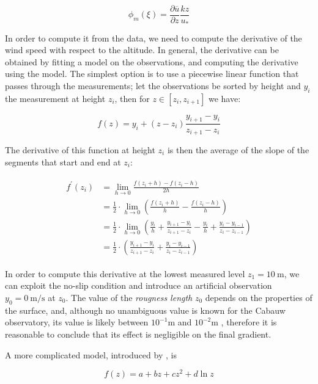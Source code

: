 \documentclass[a4paper]{book}
\begin{document}
$$
\phi_m(\xi)=\frac{\partial\overline{u}}{\partial z}\frac{kz}{u_*}
$$

In order to compute it from the data, we need to compute the derivative of the wind speed with respect to the altitude. In general, the derivative can be obtained by fitting a model on the observations, and computing the derivative using the model. The simplest option is to use a piecewise linear function that passes through the measurements; let the observations be sorted by height and $y_i$ the measurement at height $z_i$, then for $z\in[z_i,z_{i+1}]$ we have:

\begin{equation}
f(z)=y_i+(z-z_i)\frac{y_{i+1}-y_i}{z_{i+1}-z_i}
\end{equation}

The derivative of this function at height $z_i$ is then the average of the slope of the segments that start and end at $z_i$:

\begin{align}
\label{eq:fd_gradient}
\begin{split}
f^\prime(z_i)&=\lim_{h\rightarrow 0}\frac{f(z_i+h)-f(z_i-h)}{2h} \\
&=\frac{1}{2}\cdot\lim_{h\rightarrow 0}\left(\frac{f(z_i+h)}{h}-\frac{f(z_i-h)}{h}\right) \\
&=\frac{1}{2}\cdot\lim_{h\rightarrow 0}\left(
\frac{y_i}{h}+\frac{y_{i+1}-y_i}{z_{i+1}-z_i}-\frac{y_i}{h}+\frac{y_i-y_{i-1}}{z_i-z_{i-1}}
\right)\\
&=\frac{1}{2}\cdot\left(
\frac{y_{i+1}-y_i}{z_{i+1}-z_i}+\frac{y_i-y_{i-1}}{z_i-z_{i-1}}
\right)
\end{split}
\end{align}

In order to compute this derivative at the lowest measured level $z_1=\SI{10}{\meter}$, we can exploit the no-slip condition and introduce an artificial observation $y_0=\SI{0}{\meter\per\second}$ at $z_0$. The value of the \emph{rougness length} $z_0$ depends on the properties of the surface, and, although no unambiguous value is known for the Cabauw observatory, its value is likely between $10^{-1}$m and $10^{-2}$m \citep{cabauw_z0, cabauw_night}, therefore it is reasonable to conclude that its effect is negligible on the final gradient.

A more complicated model, introduced by \cite{windlogprofile}, is

\begin{equation}
\label{eq:logmodel}
f(z)=a+bz+cz^2+d\ln z
\end{equation}
\end{document}
